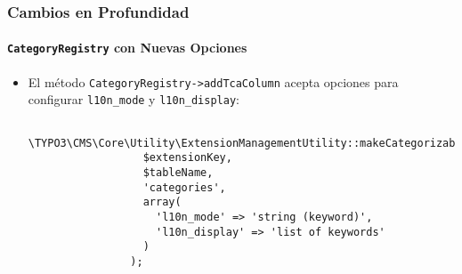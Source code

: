 \begin{frame}[fragile]
	\frametitle{Cambios en Profundidad}
	\framesubtitle{\texttt{CategoryRegistry} con Nuevas Opciones}

	\lstset{basicstyle=\tiny\ttfamily}

	\begin{itemize}

		\item El método \texttt{CategoryRegistry->addTcaColumn} acepta opciones para configurar
			\texttt{l10n\_mode} y \texttt{l10n\_display}:

			\begin{lstlisting}
				\TYPO3\CMS\Core\Utility\ExtensionManagementUtility::makeCategorizable(
				  $extensionKey,
				  $tableName,
				  'categories',
				  array(
				    'l10n_mode' => 'string (keyword)',
				    'l10n_display' => 'list of keywords'
				  )
				);
			\end{lstlisting}

	\end{itemize}

\end{frame}


